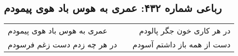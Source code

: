 \begin{center}
\section*{رباعی شماره ۴۳۲: عمری به هوس باد هوی پیمودم}
\label{sec:sh432}
\begin{longtable}{l p{0.5cm} r}
عمری به هوس باد هوی پیمودم
&&
در هر کاری خون جگر پالودم
\\
در هر چه زدم دست زغم فرسودم
&&
دست از همه باز داشتم آسودم
\\
\end{longtable}
\end{center}
